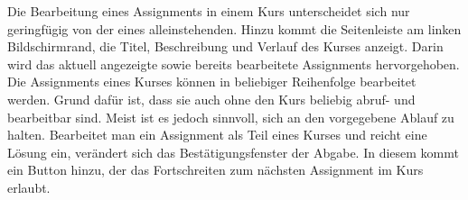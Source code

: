 Die Bearbeitung eines Assignments in einem Kurs unterscheidet sich nur geringfügig von der eines alleinstehenden.
Hinzu kommt die Seitenleiste am linken Bildschirmrand, die Titel, Beschreibung und Verlauf des Kurses anzeigt.
Darin wird das aktuell angezeigte sowie bereits bearbeitete Assignments hervorgehoben.
Die Assignments eines Kurses können in beliebiger Reihenfolge bearbeitet werden.
Grund dafür ist, dass sie auch ohne den Kurs beliebig abruf- und bearbeitbar sind.
Meist ist es jedoch sinnvoll, sich an den vorgegebene Ablauf zu halten.
Bearbeitet man ein Assignment als Teil eines Kurses und reicht eine Lösung ein, verändert sich das Bestätigungsfenster der Abgabe.
In diesem kommt ein Button hinzu, der das Fortschreiten zum nächsten Assignment im Kurs erlaubt.
